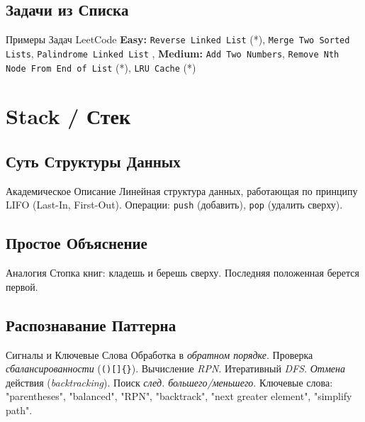 \subsection{Задачи из Списка}
\begin{myblock}{Примеры Задач LeetCode}
    \textbf{Easy:} \texttt{Reverse Linked List} (*), \texttt{Merge Two Sorted Lists}, \texttt{Palindrome Linked List} \sep
    \textbf{Medium:} \texttt{Add Two Numbers}, \texttt{Remove Nth Node From End of List} (*), \texttt{LRU Cache} (*)
\end{myblock}

\section{Stack / Стек}

\subsection{Суть Структуры Данных}
\begin{myblock}{Академическое Описание}
    Линейная структура данных, работающая по принципу LIFO (Last-In, First-Out). Операции: \texttt{push} (добавить), \texttt{pop} (удалить сверху).
\end{myblock}

\subsection{Простое Объяснение}
\begin{myblock}{Аналогия}
    Стопка книг: кладешь и берешь сверху. Последняя положенная берется первой.
\end{myblock}

\subsection{Распознавание Паттерна}
\begin{myblock}{Сигналы и Ключевые Слова}
    Обработка в \emph{обратном порядке}. Проверка \emph{сбалансированности} (\texttt{()[]\{\}}). Вычисление \emph{RPN}. Итеративный \emph{DFS}. \emph{Отмена} действия (\emph{backtracking}). Поиск \emph{след. большего/меньшего}. \newline
    Ключевые слова: "parentheses", "balanced", "RPN", "backtrack", "next greater element", "simplify path".
\end{myblock}

